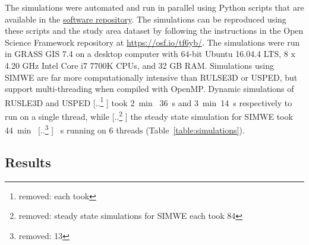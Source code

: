 \documentclass[gmd, manuscript]{copernicus}
\providecommand{\DIFadd}[1]{{\protect\color{blue} \sf #1}} %
\providecommand{\DIFdel}[1]{{\protect\color{red} [..\footnote{removed: #1} ]}} %
\providecommand{\DIFaddbegin}{} %
\providecommand{\DIFaddend}{} %
\providecommand{\DIFdelbegin}{} %
\providecommand{\DIFdelend}{} %
\providecommand{\DIFaddFL}[1]{\DIFadd{#1}} %
\begin{document}
The simulations were automated and run in parallel
using Python scripts that are available in the 
\href{https://github.com/baharmon/landscape_evolution}{software repository}.
The simulations can be reproduced using these scripts
and the study area dataset 
by following the instructions 
in the Open Science Framework repository 
at \url{https://osf.io/tf6yb/}.
The simulations were run 
in GRASS GIS 7.4 
on a desktop computer 
with 64-bit Ubuntu 16.04.4 LTS,
8 x 4.20 GHz Intel Core i7 7700K CPUs,
and 32 GB RAM. 
Simulations using SIMWE 
are far more computationally intensive
than RULSE3D or USPED, 
but support multi-threading 
when compiled with OpenMP. 
Dynamic simulations of RUSLE3D and USPED \DIFdelbegin \DIFdel{each took
}\DIFdelend \DIFaddbegin \DIFadd{took
2~}\unit{min}\DIFadd{~36~}\unit{s} \DIFadd{and 
}\DIFaddend 3~\unit{min}~14~\unit{s} \DIFaddbegin \DIFadd{respectively
}\DIFaddend to run on a single thread, 
while \DIFdelbegin \DIFdel{steady state simulations for SIMWE each took 
84}\DIFdelend \DIFaddbegin \DIFadd{the steady state simulation for SIMWE took 
44}\DIFaddend ~\unit{min}~\DIFdelbegin \DIFdel{13}\DIFdelend \DIFaddbegin \DIFadd{51}\DIFaddend ~\unit{s} running on 6 threads
(Table~\ref{table:simulations}).

\subsection{Results}

\DIFaddbegin 

\begin{table}
\small
\caption{\DIFaddFL{Landscape evolution simulations}}
\label{table:simulations} 
\end{table}
\end{document}
